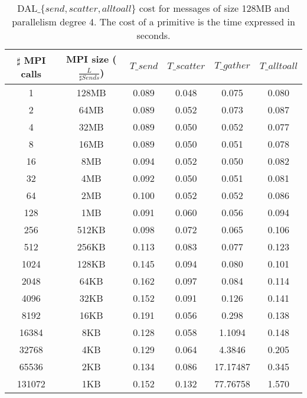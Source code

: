 \begin{table}[h]
\begin{center}
\begin{tabular}{|c|c|c|c|c|c|}\hline
\hline
$\sharp$ MPI calls & MPI size ($\frac{L}{\sharp Sends}$)  & $T\_send$   & $T\_scatter$  & $T\_gather$ & $T\_alltoall$      \\\hline\hline
1 & 128MB & 0.089 & 0.048 & 0.075 & 0.080 \\\hline
2 & 64MB & 0.089 & 0.052 & 0.073 & 0.087 \\\hline
4 & 32MB & 0.089 & 0.050 & 0.052 & 0.077 \\\hline
8 & 16MB & 0.089 & 0.050 & 0.051 & 0.078 \\\hline
16 & 8MB & 0.094 & 0.052 & 0.050 & 0.082 \\\hline
32 & 4MB & 0.092 & 0.050 & 0.051 & 0.081 \\\hline
64 & 2MB & 0.100 & 0.052 & 0.052 & 0.086 \\\hline
128 & 1MB & 0.091 & 0.060 & 0.056 & 0.094 \\\hline
256 & 512KB & 0.098 & 0.072 & 0.065 & 0.106 \\\hline
512 & 256KB & 0.113 & 0.083 & 0.077 & 0.123 \\\hline
1024 & 128KB & 0.145 & 0.094 & 0.080 & 0.101 \\\hline
2048 & 64KB & 0.162 & 0.097 & 0.084 & 0.114 \\\hline
4096 & 32KB & 0.152 & 0.091 & 0.126 & 0.141 \\\hline
8192 & 16KB & 0.191 & 0.056 & 0.298 & 0.138 \\\hline
16384 & 8KB & 0.128 & 0.058 & 1.1094 & 0.148 \\\hline
32768 & 4KB & 0.129 & 0.064 & 4.3846 & 0.205 \\\hline
65536 & 2KB & 0.134 & 0.086 & 17.17487 & 0.345 \\\hline
131072 & 1KB & 0.152 & 0.132 & 77.76758 & 1.570 \\\hline
\end{tabular}
\caption{DAL$\_\lbrace send, scatter, alltoall \rbrace$ cost for messages of size 128MB and parallelism degree 4. The cost of a primitive is the time expressed in seconds.}
\label{tsetup-pcm-n4-M128}
\end{center}
\end{table}


